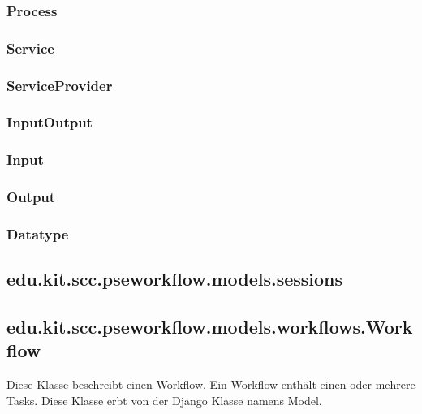         \subsubsection{Process}
        
        
        
        \subsubsection{Service}
        
        \subsubsection{ServiceProvider}
        
        \subsubsection{InputOutput}
        
        \subsubsection{Input}
        
        \subsubsection{Output}
        
        \subsubsection{Datatype}

    \subsection{edu.kit.scc.pseworkflow.models.sessions}

        \subsection{edu.kit.scc.pseworkflow.models.workflows.Workflow}
	        Diese Klasse beschreibt einen Workflow. Ein Workflow enthält einen oder mehrere Tasks. \newline
	        Diese Klasse erbt von der Django Klasse namens \glqq Model\grqq .
                    
